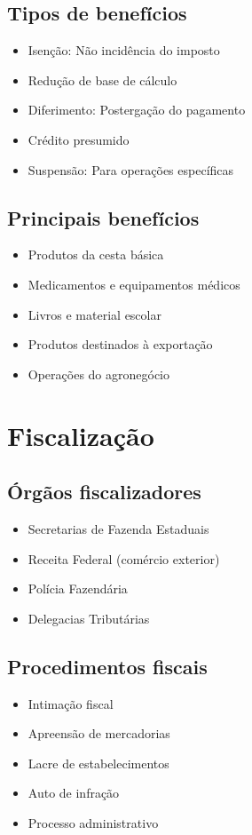 \documentclass[12pt,a4paper]{article}
\begin{document}
\subsection{Tipos de benefícios}
\begin{itemize}
    \item Isenção: Não incidência do imposto
    \item Redução de base de cálculo
    \item Diferimento: Postergação do pagamento
    \item Crédito presumido
    \item Suspensão: Para operações específicas
\end{itemize}

\subsection{Principais benefícios}
\begin{itemize}
    \item Produtos da cesta básica
    \item Medicamentos e equipamentos médicos
    \item Livros e material escolar
    \item Produtos destinados à exportação
    \item Operações do agronegócio
\end{itemize}

\section{Fiscalização}

\subsection{Órgãos fiscalizadores}
\begin{itemize}
    \item Secretarias de Fazenda Estaduais
    \item Receita Federal (comércio exterior)
    \item Polícia Fazendária
    \item Delegacias Tributárias
\end{itemize}

\subsection{Procedimentos fiscais}
\begin{itemize}
    \item Intimação fiscal
    \item Apreensão de mercadorias
    \item Lacre de estabelecimentos
    \item Auto de infração
    \item Processo administrativo
\end{itemize}
\end{document}
